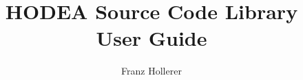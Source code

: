 \documentclass[a4paper]{report}
\begin{document}
\title{HODEA Source Code Library\\
User Guide}
\author{Franz Hollerer}

\maketitle
\tableofcontents


\end{document}
